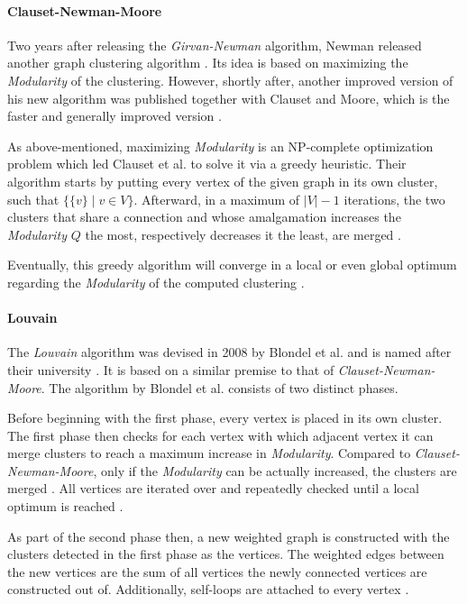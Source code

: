 \documentclass[12pt,a4paper]{report}
\begin{document}
\paragraph{Clauset-Newman-Moore \cite{clauset2004modularity}}
Two years after
releasing the \textit{Girvan-Newman} algorithm, Newman released another graph
clustering algorithm \cite{newman2004fast}. Its idea is based on maximizing the
\textit{Modularity} of the clustering. However, shortly after, another improved
version of his new algorithm was published together with Clauset and Moore,
which is the faster and generally improved version \cite{clauset2004modularity}.

As above-mentioned, maximizing \textit{Modularity} is an NP-complete
optimization problem which led Clauset et al. to solve it via a greedy
heuristic. Their algorithm starts by putting every vertex of the given graph in
its own cluster, such that \(\{\{v\} \mid v \in V\}\). Afterward, in a maximum
of \(\vert V \vert - 1\) iterations, the two clusters that share a connection
and whose amalgamation increases the \textit{Modularity} \(Q\) the most,
respectively decreases it the least, are merged \cite{clauset2004modularity}.

Eventually, this greedy algorithm will converge in a local or even global
optimum regarding the \textit{Modularity} of the computed clustering
\cite{clauset2004modularity}.

\paragraph{Louvain \cite{blondel2008modularity}}
The \textit{Louvain} algorithm
was devised in 2008 by Blondel et al. and is named after their university
\cite{blondel2008modularity}. It is based on a similar premise to that of
\textit{Clauset-Newman-Moore}.
The algorithm by Blondel et al. consists of two distinct phases.

Before beginning with the first phase, every vertex is placed in its own
cluster. The first phase then checks for each vertex with which adjacent vertex
it can merge clusters to reach a maximum increase in \textit{Modularity}.
Compared to \textit{Clauset-Newman-Moore}, only if the \textit{Modularity} can
be actually increased, the clusters are merged \cite{blondel2008modularity}.
All vertices are iterated over and repeatedly checked until a local optimum is
reached \cite{blondel2008modularity}.

As part of the second phase then, a new weighted graph is constructed with the
clusters detected in the first phase as the vertices. The weighted edges
between the new vertices are the sum of all vertices the newly connected
vertices are constructed out of. Additionally, self-loops are attached to every
vertex \cite{blondel2008modularity}.
\end{document}
